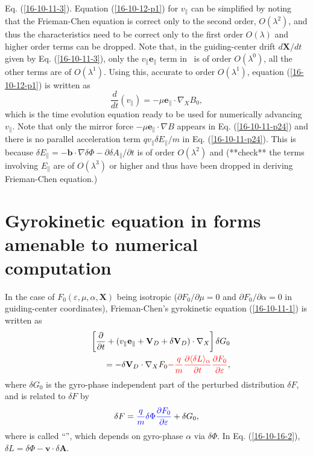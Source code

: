 \documentclass{article}
\newcommand{\tmcolor}[2]{{\color{#1}{#2}}}
\begin{document}
Eq. (\ref{16-10-11-3}). Equation (\ref{16-10-12-p1}) for $v_{\parallel}$ can
be simplified by noting that the Frieman-Chen equation is correct only to the
second order, $O (\lambda^2)$, and thus the characteristics need to be correct
only to the first order $O (\lambda)$ and higher order terms can be dropped.
Note that, in the guiding-center drift $d\mathbf{X}/ d t$ given by Eq.
(\ref{16-10-11-3}), only the $v_{\parallel} \mathbf{e}_{\parallel}$ term in \
is of order $O (\lambda^0)$, all the other terms are of $O (\lambda^1)$. Using
this, accurate to order $O (\lambda^1)$, equation (\ref{16-10-12-p1}) is
written as
\begin{equation}
  \label{16-10-11-p24} \frac{d}{d t} (v_{\parallel}) = - \mu
  \mathbf{e}_{\parallel} \cdot \nabla_X B_0,
\end{equation}
which is the time evolution equation ready to be used for numerically
advancing $v_{\parallel}$. Note that only the mirror force $- \mu
\mathbf{e}_{\parallel} \cdot \nabla B$ appears in Eq. (\ref{16-10-11-p24}) and
there is no parallel acceleration term $q v_{\parallel} \delta E_{\parallel} /
m$ in Eq. (\ref{16-10-11-p24}). This is because $\delta E_{\parallel} =
-\mathbf{b} \cdot \nabla \delta \Phi - \partial \delta A_{\parallel} /
\partial t$ is of order $O (\lambda^2)$ and (**check** the terms involving
$E_{\parallel}$ are of $O (\lambda^3)$ or higher and thus have been dropped in
deriving Frieman-Chen equation.)

\section{Gyrokinetic equation in forms amenable to numerical computation}

In the case of $F_0 (\varepsilon, \mu, \alpha, \mathbf{X})$ being isotropic
($\partial F_0 / \partial \mu = 0$ and $\partial F_0 / \partial \alpha = 0$ in
guiding-center coordinates), Frieman-Chen's gyrokinetic equation
(\ref{16-10-11-1}) is written as
\begin{eqnarray}
  &  & \left[ \frac{\partial}{\partial t} + (v_{\parallel}
  \mathbf{e}_{\parallel} +\mathbf{V}_D + \delta \mathbf{V}_D) \cdot \nabla_X
  \right] \delta G_0 \nonumber\\
  &  & = - \delta \mathbf{V}_D \cdot \nabla_X F_0 \tmcolor{red}{- \frac{q}{m}
  \frac{\partial \langle \delta L \rangle_{\alpha}}{\partial t}
  \frac{\partial F_0}{\partial \varepsilon}},  \label{16-10-16-2}
\end{eqnarray}
where $\delta G_0$ is the gyro-phase independent part of the perturbed
distribution $\delta F$, and is related to $\delta F$ by
\begin{equation}
  \delta F = \tmcolor{blue}{\frac{q}{m} \delta \Phi \frac{\partial
  F_0}{\partial \varepsilon}} + \delta G_0,
\end{equation}
where \tmcolor{blue}{the first term} is called ``\tmcolor{blue}{the adiabatic
term}'', which depends on gyro-phase $\alpha$ via $\delta \Phi$. In Eq.
(\ref{16-10-16-2}), $\delta L = \delta \Phi -\mathbf{v} \cdot \delta
\mathbf{A}$.
\end{document}
